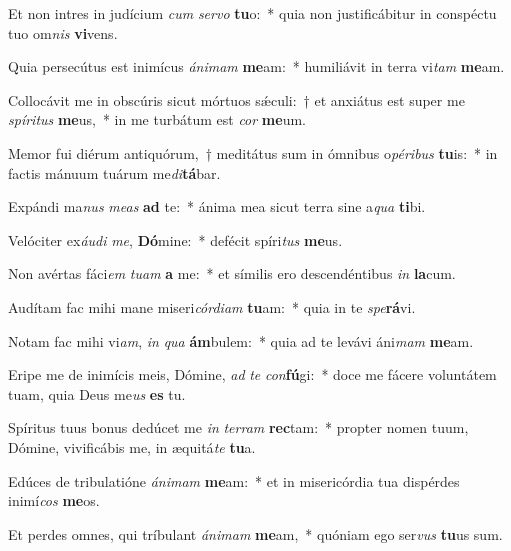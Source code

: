 \item Et non intres in judícium \textit{cum} \textit{ser}\textit{vo} \textbf{tu}o:~* quia non justificábitur in conspéctu tuo om\textit{nis} \textbf{vi}vens.
\item Quia persecútus est inimícus \textit{á}\textit{ni}\textit{mam} \textbf{me}am:~* humiliávit in terra vi\textit{tam} \textbf{me}am.
\item Collocávit me in obscúris sicut mórtuos sǽculi:~† et anxiátus est super me \textit{spí}\textit{ri}\textit{tus} \textbf{me}us,~* in me turbátum est \textit{cor} \textbf{me}um.
\item Memor fui diérum antiquórum,~† meditátus sum in ómnibus o\textit{pé}\textit{ri}\textit{bus} \textbf{tu}is:~* in factis mánuum tuárum me\textit{di}\textbf{tá}bar.
\item Expándi ma\textit{nus} \textit{me}\textit{as} \textbf{ad} te:~* ánima mea sicut terra sine a\textit{qua} \textbf{ti}bi.
\item Velóciter ex\textit{áu}\textit{di} \textit{me}, \textbf{Dó}mine:~* defécit spíri\textit{tus} \textbf{me}us.
\item Non avértas fáci\textit{em} \textit{tu}\textit{am} \textbf{a} me:~* et símilis ero descendéntibus \textit{in} \textbf{la}cum.
\item Audítam fac mihi mane miseri\textit{cór}\textit{di}\textit{am} \textbf{tu}am:~* quia in te \textit{spe}\textbf{rá}vi.
\item Notam fac mihi vi\textit{am}, \textit{in} \textit{qua} \textbf{ám}bulem:~* quia ad te levávi áni\textit{mam} \textbf{me}am.
\item Eripe me de inimícis meis, Dómine, \textit{ad} \textit{te} \textit{con}\textbf{fú}gi:~* doce me fácere voluntátem tuam, quia Deus me\textit{us} \textbf{es} tu.
\item Spíritus tuus bonus dedúcet me \textit{in} \textit{ter}\textit{ram} \textbf{rec}tam:~* propter nomen tuum, Dómine, vivificábis me, in æquitá\textit{te} \textbf{tu}a.
\item Edúces de tribulatióne \textit{á}\textit{ni}\textit{mam} \textbf{me}am:~* et in misericórdia tua dispérdes inimí\textit{cos} \textbf{me}os.
\item Et perdes omnes, qui tríbulant \textit{á}\textit{ni}\textit{mam} \textbf{me}am,~* quóniam ego ser\textit{vus} \textbf{tu}us sum.
